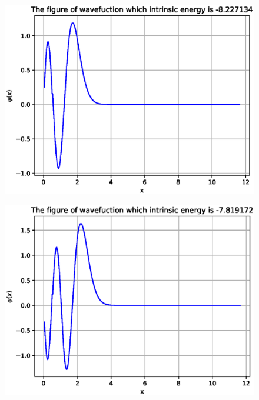 \documentclass[twoside,twocolumn]{article}
\begin{document}
\begin{CJK*}{UTF8}{gkai}
\begin{figure}[htb]
	\centering
	\includegraphics[width=0.98\linewidth]{figure/3}
	\label{fig:3}
\end{figure}
\begin{figure}[htb]
	\centering
	\includegraphics[width=0.98\linewidth]{figure/4}
	\label{fig:4}
\end{figure}


\end{CJK*}
\end{document}
